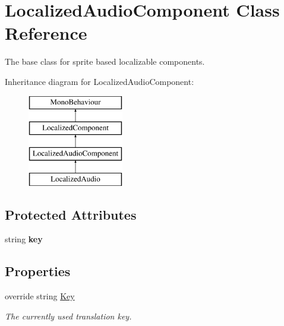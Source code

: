 \hypertarget{class_localized_audio_component}{}\section{Localized\+Audio\+Component Class Reference}
\label{class_localized_audio_component}


The base class for sprite based localizable components.  


Inheritance diagram for Localized\+Audio\+Component\+:\begin{figure}[H]
\begin{center}
\leavevmode
\includegraphics[height=4.000000cm]{class_localized_audio_component}
\end{center}
\end{figure}
\subsection*{Protected Attributes}
\begin{DoxyCompactItemize}
\item 
string {\bfseries key}\hypertarget{class_localized_audio_component_a23f82175bab9129f8149df1c679e1964}{}\label{class_localized_audio_component_a23f82175bab9129f8149df1c679e1964}

\end{DoxyCompactItemize}
\subsection*{Properties}
\begin{DoxyCompactItemize}
\item 
override string \hyperlink{class_localized_audio_component_aa68a3f40abf5b65a51440ff896e65575}{Key}
\begin{DoxyCompactList}\small\item\em The currently used translation key. \end{DoxyCompactList}\end{DoxyCompactItemize}
